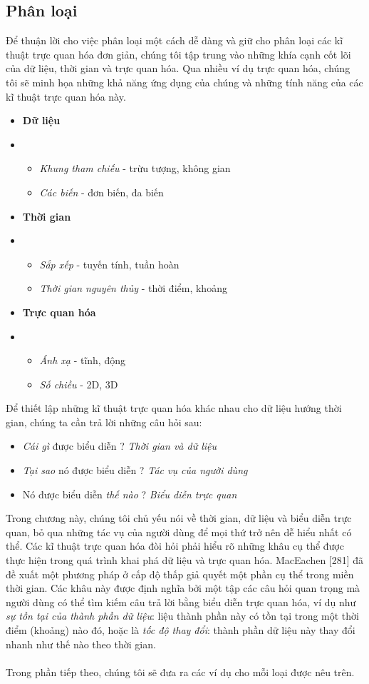 \subsection{Phân loại} \label{sub:3.1.cate}
Để thuận lời cho việc phân loại một cách dễ dàng và giữ cho phân loại các kĩ thuật trực quan hóa đơn giản, chúng tôi tập trung vào những khía cạnh cốt lõi của dữ liệu, thời gian và trực quan hóa. Qua nhiều ví dụ trực quan hóa, chúng tôi sẽ minh họa những khả năng ứng dụng của chúng và những tính năng của các kĩ thuật trực quan hóa này.
\begin{itemize}
    \item \textbf{Dữ liệu} 
    \item[] \begin{itemize}
        \item \textit{Khung tham chiếu} - trừu tượng, không gian
        \item \textit{Các biến} - đơn biến, đa biến
    \end{itemize}
    \item \textbf{Thời gian}
    \item[] \begin{itemize}
        \item \textit{Sắp xếp} - tuyến tính, tuần hoàn
        \item \textit{Thời gian nguyên thủy} - thời điểm, khoảng
    \end{itemize}
    \item \textbf{Trực quan hóa}
    \item[] \begin{itemize}
        \item \textit{Ánh xạ} - tĩnh, động
        \item \textit{Số chiều} - 2D, 3D
    \end{itemize}
\end{itemize}
Để thiết lập những kĩ thuật trực quan hóa khác nhau cho dữ liệu hướng thời gian, chúng ta cần trả lời những câu hỏi sau:
\begin{itemize}
    \item \textit{Cái gì} được biểu diễn ? \textit{Thời gian và dữ liệu}
    \item \textit{Tại sao} nó được biểu diễn ? \textit{Tác vụ của người dùng}
    \item Nó được biểu diễn \textit{thế nào} ? \textit{Biểu diễn trực quan}
\end{itemize}
Trong chương này, chúng tôi chủ yếu nói về thời gian, dữ liệu và biểu diễn trực quan, bỏ qua những tác vụ của người dùng để mọi thứ trở nên dễ hiểu nhất có thể. Các kĩ thuật trực quan hóa đòi hỏi phải hiểu rõ những khâu cụ thể được thực hiện trong quá trình khai phá dữ liệu và trực quan hóa. MacEachen [281] đã đề xuất một phương pháp ở cấp độ thấp giả quyết một phần cụ thể trong miền thời gian. Các khâu này được định nghĩa bởi một tập các câu hỏi quan trọng mà người dùng có thể tìm kiếm câu trả lời bằng biểu diễn trực quan hóa, ví dụ như \textit{sự tồn tại của thành phần dữ liệu}: liệu thành phần này có tồn tại trong một thời điểm (khoảng) nào đó, hoặc là \textit{tốc độ thay đổi}: thành phần dữ liệu này thay đổi nhanh như thế nào theo thời gian. 
\\ \\
Trong phần tiếp theo, chúng tôi sẽ đưa ra các ví dụ cho mỗi loại được nêu trên.
